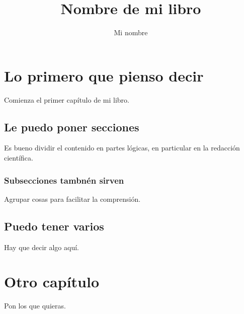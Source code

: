 \documentclass{book}
\title{Nombre de mi libro}
\author{Mi nombre}
\begin{document}
\maketitle

\tableofcontents

\chapter{Lo primero que pienso decir}

Comienza el primer capítulo de mi libro.

\section{Le puedo poner secciones}

Es bueno dividir el contenido en partes lógicas, en particular en la redacción científica.

\subsection{Subsecciones tambnén sirven}

Agrupar cosas para facilitar la comprensión.

\section{Puedo tener varios}

Hay que decir algo aquí.

\chapter{Otro capítulo}

Pon los que quieras.
\end{document}
